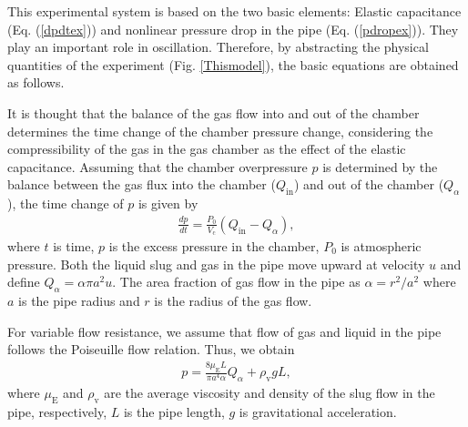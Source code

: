 \documentclass[aps,pre,preprint,groupedaddress,showkeys]{revtex4-2}
\begin{document}
This experimental system is based on the two basic elements: Elastic capacitance (Eq. (\ref{dpdtex})) and nonlinear pressure drop in the pipe (Eq. (\ref{pdropex})). 
They play an important role in oscillation.
Therefore, by abstracting the physical quantities of the experiment (Fig. \ref{Thismodel}), the basic equations are obtained as follows.
 
It is thought that the balance of the gas flow into and out of the chamber determines the time change of the chamber pressure change, considering the compressibility of the gas in the gas chamber as the effect of the elastic capacitance.
Assuming that the chamber overpressure $p$ is determined by the balance between the gas flux into the chamber ($ Q_ \mathrm{in} $) and out of the chamber ($ Q_ \alpha $), the time change of $ p $ is given by
\begin{eqnarray}
\frac{dp}{dt}=\frac{P_0}{V_\mathrm{c}} \left(  Q_\mathrm{in} - Q_\alpha \right),
\label{dpdtex}
\end{eqnarray}
where $t$ is time, $p$ is the excess pressure in the chamber, $P_0$ is atmospheric pressure.
Both the liquid slug and gas in the pipe move upward at velocity $u$ and define $Q_\alpha = \alpha \pi a^2 u$. 
The area fraction of gas flow in the pipe as $\alpha = r^2/a^2$ where $a$ is the pipe radius and $r$ is the radius of the gas flow.


For variable flow resistance, we assume that flow of gas and liquid in the pipe follows the Poiseuille flow relation. 
Thus, we obtain
\begin{eqnarray}
p=\frac{8\mu_\mathrm{E} L}{\pi a^4 \alpha} Q_\alpha  + \rho_\mathrm{v} g L,
\label{pdropex}
\end{eqnarray}
where $\mu_\mathrm{E}$ and $\rho_\mathrm{v}$ are the average viscosity and density of the slug flow in the pipe, respectively, $L$ is the pipe length, $g$ is gravitational acceleration.
\end{document}

